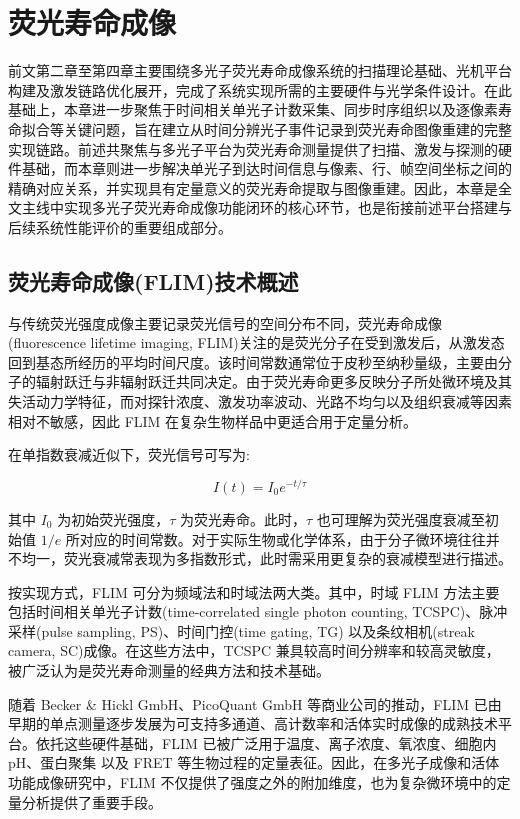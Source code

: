 \chapter{荧光寿命成像}\label{Chap:5}

前文第二章至第四章主要围绕多光子荧光寿命成像系统的扫描理论基础、光机平台构建及激发链路优化展开，完成了系统实现所需的主要硬件与光学条件设计。在此基础上，本章进一步聚焦于时间相关单光子计数采集、同步时序组织以及逐像素寿命拟合等关键问题，旨在建立从时间分辨光子事件记录到荧光寿命图像重建的完整实现链路。前述共聚焦与多光子平台为荧光寿命测量提供了扫描、激发与探测的硬件基础，而本章则进一步解决单光子到达时间信息与像素、行、帧空间坐标之间的精确对应关系，并实现具有定量意义的荧光寿命提取与图像重建。因此，本章是全文主线中实现多光子荧光寿命成像功能闭环的核心环节，也是衔接前述平台搭建与后续系统性能评价的重要组成部分。

\section{荧光寿命成像(FLIM)技术概述}\label{5.1}

与传统荧光强度成像主要记录荧光信号的空间分布不同，荧光寿命成像(fluorescence lifetime imaging, FLIM)关注的是荧光分子在受到激发后，从激发态回到基态所经历的平均时间尺度。该时间常数通常位于皮秒至纳秒量级，主要由分子的辐射跃迁与非辐射跃迁共同决定。由于荧光寿命更多反映分子所处微环境及其失活动力学特征，而对探针浓度、激发功率波动、光路不均匀以及组织衰减等因素相对不敏感，因此 FLIM 在复杂生物样品中更适合用于定量分析\cite{RN563}。

在单指数衰减近似下，荧光信号可写为:

\begin{equation}
  I(t)=I_0 e^{-t/\tau}
\end{equation}

其中 $I_0$ 为初始荧光强度，$\tau$ 为荧光寿命。此时，$\tau$ 也可理解为荧光强度衰减至初始值 $1/e$ 所对应的时间常数。对于实际生物或化学体系，由于分子微环境往往并不均一，荧光衰减常表现为多指数形式，此时需采用更复杂的衰减模型进行描述\cite{RN2036}。

按实现方式，FLIM 可分为频域法和时域法两大类\cite{RN1623}。其中，时域 FLIM 方法主要包括时间相关单光子计数(time-correlated single photon counting, TCSPC)、脉冲采样(pulse sampling, PS)\cite{RN2118}、时间门控(time gating, TG)\cite{RN2120} 以及条纹相机(streak camera, SC)成像\cite{RN568,RN2075}。在这些方法中，TCSPC 兼具较高时间分辨率和较高灵敏度，被广泛认为是荧光寿命测量的经典方法和技术基础。

随着 Becker \& Hickl GmbH、PicoQuant GmbH 等商业公司的推动，FLIM 已由早期的单点测量逐步发展为可支持多通道、高计数率和活体实时成像的成熟技术平台\cite{RN1656,RN897,RN2050,RN2049}。依托这些硬件基础，FLIM 已被广泛用于温度\cite{RN2037,RN127}、离子浓度\cite{RN2038}、氧浓度\cite{RN2040}、细胞内 pH\cite{RN2042}、蛋白聚集\cite{RN2041} 以及 FRET \cite{RN913,RN1809,RN247} 等生物过程的定量表征。因此，在多光子成像和活体功能成像研究中，FLIM 不仅提供了强度之外的附加维度，也为复杂微环境中的定量分析提供了重要手段。



